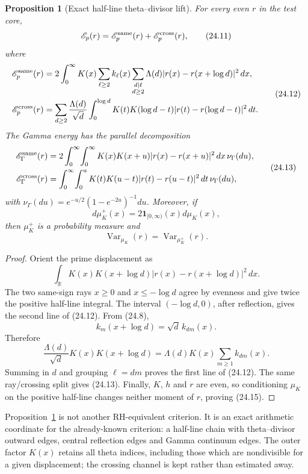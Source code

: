 \documentclass[11pt]{amsart}
\newtheorem{proposition}[theorem]{Proposition}
\theoremstyle{definition}
\theoremstyle{remark}
\begin{document}
\begin{proposition}[Exact half-line theta--divisor lift]
\label{prop:theta-divisor-lift}
For every even \(r\) in the test core,
\[
 \mathscr E_p(r)
 =\mathscr E_p^{\rm same}(r)+\mathscr E_p^{\rm cross}(r),
\tag{24.11}
\]
where
\[
 \begin{aligned}
 \mathscr E_p^{\rm same}(r)
 &=2\int_0^\infty K(x)
   \sum_{\ell\ge2}k_\ell(x)
   \sum_{\substack{d\mid\ell\\d\ge2}}
   \Lambda(d)|r(x)-r(x+\log d)|^2\,dx,\\
 \mathscr E_p^{\rm cross}(r)
 &=\sum_{d\ge2}\frac{\Lambda(d)}{\sqrt d}
   \int_0^{\log d}K(t)K(\log d-t)
   |r(t)-r(\log d-t)|^2\,dt.
 \end{aligned}
\tag{24.12}
\]
The Gamma energy has the parallel decomposition
\[
 \begin{aligned}
 \mathscr E_\Gamma^{\rm same}(r)
 &=2\int_0^\infty\!\int_0^\infty
 K(x)K(x+u)|r(x)-r(x+u)|^2\,dx\,\nu_\Gamma(du),\\
 \mathscr E_\Gamma^{\rm cross}(r)
 &=\int_0^\infty\!\int_0^u
 K(t)K(u-t)|r(t)-r(u-t)|^2\,dt\,\nu_\Gamma(du),
 \end{aligned}
\tag{24.13}
\]
with \(\nu_\Gamma(du)=e^{-u/2}(1-e^{-2u})^{-1}du\).
Moreover, if
\[
 d\mu_K^+(x)=2\mathbf1_{[0,\infty)}(x)d\mu_K(x),
\tag{24.14}
\]
then \(\mu_K^+\) is a probability measure and
\[
 \operatorname{Var}_{\mu_K}(r)
 =\operatorname{Var}_{\mu_K^+}(r).
\tag{24.15}
\]
\end{proposition}

\begin{proof}
Orient the prime displacement as
\[
 \int_\mathbb R K(x)K(x+\log d)
 |r(x)-r(x+\log d)|^2\,dx.
\]
The two same-sign rays \(x\ge0\) and
\(x\le-\log d\) agree by evenness and give twice the positive
half-line integral.  The interval \((-\log d,0)\), after reflection,
gives the second line of (24.12).  From (24.8),
\[
 k_m(x+\log d)=\sqrt d\,k_{dm}(x).
\tag{24.16}
\]
Therefore
\[
 \frac{\Lambda(d)}{\sqrt d}K(x)K(x+\log d)
 =\Lambda(d)K(x)\sum_{m\ge1}k_{dm}(x).
\]
Summing in \(d\) and grouping \(\ell=dm\) proves the first line of
(24.12).  The same ray/crossing split gives (24.13).  Finally, \(K\),
\(h\) and \(r\) are even, so conditioning \(\mu_K\) on the positive
half-line changes neither moment of \(r\), proving (24.15).
\end{proof}

Proposition~\ref{prop:theta-divisor-lift} is not another RH-equivalent
criterion.  It is an exact arithmetic coordinate for the already-known
criterion: a half-line chain with theta--divisor outward edges, central
reflection edges and Gamma continuum edges.  The outer factor \(K(x)\)
retains all theta indices, including those which are nondivisible for a
given displacement; the crossing channel is kept rather than estimated
away.
\end{document}
